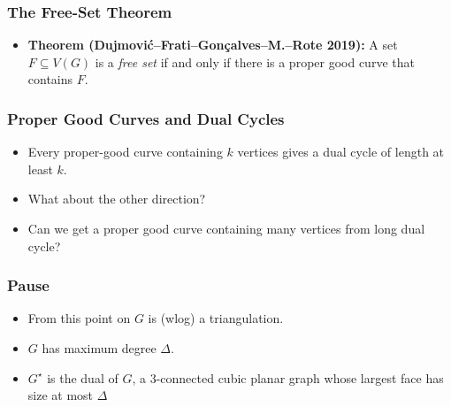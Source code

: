 \documentclass[xcolor=dvipsnames]{beamer}
\newcommand{\dual}[1]{#1^\star}
\begin{document}
\begin{frame}
   \frametitle{The Free-Set Theorem}
   
   \begin{itemize}
       \item[]\textbf{Theorem (Dujmovi\'c--Frati--Gon\c{c}alves--M.--Rote 2019):} A set $F\subseteq V(G)$ is a \emph{free set} if and only if there is a proper good curve that contains $F$.
   \end{itemize}
\end{frame}

\begin{frame}
  \frametitle{Proper Good Curves and Dual Cycles} 

  \begin{itemize}
     \item Every proper-good curve containing $k$ vertices gives a dual
       cycle of length at least $k$.
       \begin{center}
       \end{center}
     \item<5-> What about the other direction?
     \item<6-> Can we get a proper good curve containing many vertices from long dual cycle?
  \end{itemize}
\end{frame}

\begin{frame}
   \frametitle{Pause}

   \begin{itemize}
      \item From this point on $G$ is (wlog) a triangulation.
      \item $G$ has maximum degree $\Delta$.
      \item $\dual{G}$ is the dual of $G$, a 3-connected cubic planar
      graph whose largest face has size at most $\Delta$
   \end{itemize}
\end{frame}
\end{document}
